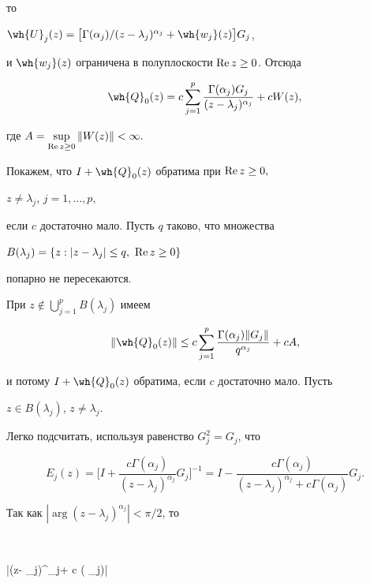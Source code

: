 то


$\wh{U}_j(z)=


\big [{\Gamma ( \alpha _j)}/


{(z- \lambda _j)^{\alpha_j}}+\wh{w_j}(z) \big ]G_j$,


и $\wh{w_j}(z)$ ограничена в полуплоскости $\operatorname{Re} z \geq 0$. Отсюда


$$


\wh{Q}_0(z)=c \sum_{j=1}^p \frac{\Gamma ( \alpha _j)G_j}{(z- \lambda _j)^


{\alpha_j}}+cW(z),


$$


где $A= \sup \limits_{\operatorname{Re} z \geq 0}\|W(z)\| < \infty.$


Покажем, что $I+\wh{Q}_0(z) $ обратима при $\operatorname{Re} z \geq 0,$


$ z \neq \lambda_j$, $j=1, \dotsc, p,$


если $c$ достаточно мало. Пусть $q$ таково, что множества


$B( \lambda_j)=\{z:|z - \lambda_j| \leq q,\ \re z \geq 0 \}$


попарно не пересекаются.


При $z \notin \bigcup \limits_{j=1}^p B( \lambda_j)$ имеем


$$


\|\wh{Q}_0(z)\| \le c \sum_{j=1}^p \frac{\Gamma ( \alpha _j)\|G_j\|}


{q^{\alpha_j}}+cA,


$$


и потому $I+\wh{Q}_0(z)$ обратима, если $c$ достаточно мало. Пусть


$z \in B( \lambda_j)$, $z \neq \lambda_j$.


Легко подсчитать, используя равенство $G_j^2=G_j$, что


$$


E_j(z)= \bigg [I+\frac{c \Gamma ( \alpha _j)}


{(z- \lambda _j)^{\alpha_j}}G_j \bigg ]^{-1}=


I-\frac{c \Gamma ( \alpha _j)}{(z- \lambda _j)^{\alpha_j}+


c \Gamma ( \alpha _j)}G_j.


$$


Так как $| \arg {(z- \lambda _j)^{\alpha_j}}| < {\pi/2}$, то


$$


|(z- \lambda _j)^{\alpha_j}+ c \Gamma ( \alpha _j)| \ge


 \ge


